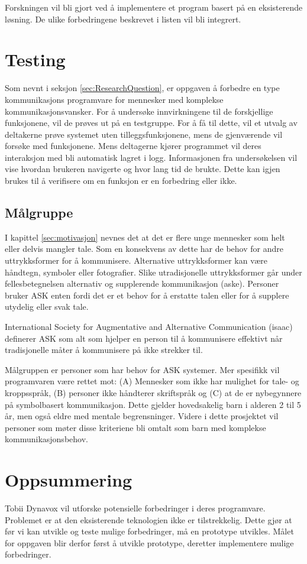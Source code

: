 Forskningen vil bli gjort ved å implementere et program basert på en eksisterende løsning. De ulike forbedringene beskrevet i listen vil bli integrert.

\section{Testing}

Som nevnt i seksjon \ref{sec:ResearchQuestion}, er oppgaven å forbedre en type kommunikasjons programvare for mennesker med komplekse kommunikasjonsvansker. For å undersøke innvirkningene til de forskjellige funksjonene, vil de prøves ut på en testgruppe. For å få til dette, vil et utvalg av deltakerne prøve systemet uten tilleggsfunksjonene, mens de gjenværende vil forsøke med funksjonene. Mens deltagerne kjører programmet vil deres interaksjon med bli automatisk lagret i logg. Informasjonen fra undersøkelsen vil vise hvordan brukeren navigerte og hvor lang tid de brukte. Dette kan igjen brukes til å verifisere om en funksjon er en forbedring eller ikke.

\subsection{Målgruppe}

I kapittel \ref{sec:motivasjon} nevnes det at det er flere unge mennesker som helt eller delvis mangler tale. Som en konsekvens av dette har de behov for andre uttrykksformer for å kommunisere. Alternative uttrykksformer kan være håndtegn, symboler eller fotografier. Slike utradisjonelle uttrykksformer går under fellesbetegnelsen alternativ og supplerende kommunikasjon (\gls{aske}).
Personer bruker ASK enten fordi det er et behov for å erstatte talen eller for å supplere utydelig eller svak tale.

International Society for Augmentative and Alternative Communication (\gls{isaac}) \cite{HvaErASK} definerer ASK som alt som hjelper en person til å kommunisere effektivt når tradisjonelle måter å kommunisere på ikke strekker til.

Målgruppen er personer som har behov for ASK systemer. Mer spesifikk vil programvaren være rettet mot: (A) Mennesker som ikke har mulighet for tale- og kroppsspråk,  (B) personer ikke håndterer skriftspråk og (C) at de er nybegynnere på symbolbasert kommunikasjon. Dette gjelder hovedsakelig barn i alderen 2 til 5 år, men også eldre med mentale begrensninger. Videre i dette prosjektet vil personer som møter disse kriteriene bli omtalt som barn med komplekse kommunikasjonsbehov. 


\section{Oppsummering}

Tobii Dynavox vil utforske potensielle forbedringer i deres programvare. Problemet er at den eksisterende teknologien ikke er tilstrekkelig. Dette gjør at før vi kan utvikle og teste mulige forbedringer, må en prototype utvikles. Målet for oppgaven blir derfor først å utvikle prototype, deretter implementere mulige forbedringer.